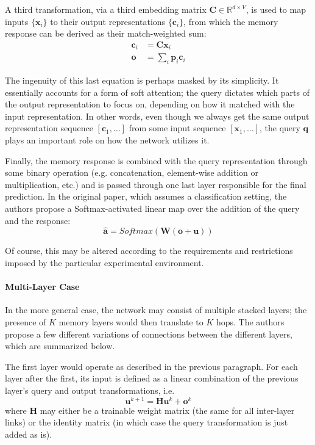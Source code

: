 \documentclass[]{article}
\begin{document}
A third transformation, via a third embedding matrix $\pmb{C} \in \mathbb{R}^{d\times V}$, is used to map inputs $\{\pmb{x}_i\}$ to their output representations $\{\pmb{c}_i\}$, from which the memory response can be derived as their match-weighted sum:
\begin{align}
\tag{Output Transformation}
\pmb{c}_i &= \pmb{C}\pmb{x}_i\\
\tag{Memory Response}
\pmb{o} &= \sum\limits_i{\pmb{p}_i\pmb{c}_i}
\end{align}

The ingenuity of this last equation is perhaps masked by its simplicity. It essentially accounts for a form of soft attention; the query dictates which parts of the output representation to focus on, depending on how it matched with the input representation. In other words, even though we always get the same output representation sequence $[\pmb{c}_1,\dots]$ from some input sequence $[\pmb{x}_1,\dots]$, the query $\pmb{q}$ plays an important role on how the network utilizes it.

Finally, the memory response is combined with the query representation through some binary operation (e.g. concatenation, element-wise addition or multiplication, etc.) and is passed through one last layer responsible for the final prediction. In the original paper, which assumes a classification setting, the authors propose a Softmax-activated linear map over the addition of the query and the response:
\[
\tag{Final Prediction}
\hat{\pmb{a}} = Softmax(\pmb{W} (\pmb{o}+\pmb{u}))
\]

Of course, this may be altered according to the requirements and restrictions imposed by the particular experimental environment. 

\paragraph{Multi-Layer Case}
In the more general case, the network may consist of multiple stacked layers; the presence of $K$ memory layers would then translate to $K$ hops. The authors propose a few different variations of connections between the different layers, which are summarized below. 

The first layer would operate as described in the previous paragraph. For each layer after the first, its input is defined as a linear combination of the previous layer's query and output transformations, i.e.
\[
\tag{Next Query}
\pmb{u}^{k+1} = \pmb{H}\pmb{u}^{k} + \pmb{o}^k 
\]
where $\pmb{H}$ may either be a trainable weight matrix (the same for all inter-layer links) or the identity matrix (in which case the query transformation is just added as is).
\end{document}
